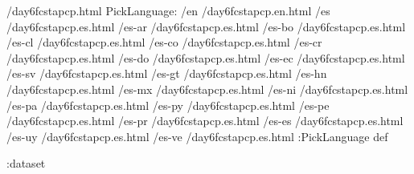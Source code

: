 \begin{ingrid}
/day6fcstapcp.html {
PickLanguage:
/en /day6fcstapcp.en.html
/es /day6fcstapcp.es.html
/es-ar /day6fcstapcp.es.html
/es-bo /day6fcstapcp.es.html
/es-cl /day6fcstapcp.es.html
/es-co /day6fcstapcp.es.html
/es-cr /day6fcstapcp.es.html
/es-do /day6fcstapcp.es.html
/es-ec /day6fcstapcp.es.html
/es-sv /day6fcstapcp.es.html
/es-gt /day6fcstapcp.es.html
/es-hn /day6fcstapcp.es.html
/es-mx /day6fcstapcp.es.html
/es-ni /day6fcstapcp.es.html
/es-pa /day6fcstapcp.es.html
/es-py /day6fcstapcp.es.html
/es-pe /day6fcstapcp.es.html
/es-pr /day6fcstapcp.es.html
/es-es /day6fcstapcp.es.html
/es-uy /day6fcstapcp.es.html
/es-ve /day6fcstapcp.es.html
:PickLanguage
} def

:dataset
\end{ingrid}
